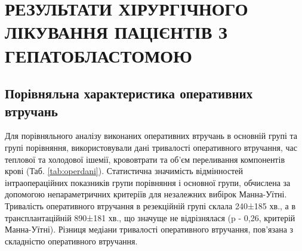 \chapter{РЕЗУЛЬТАТИ ХІРУРГІЧНОГО ЛІКУВАННЯ ПАЦІЄНТІВ З ГЕПАТОБЛАСТОМОЮ}

\section{Порівняльна характеристика оперативних втручань}
Для порівняльного аналізу виконаних оперативних втручань в основній групі та групі порівняння, використовували дані тривалості оперативного втручання, час теплової та холодової ішемії, крововтрати та об'єм переливання компонентів крові (Таб. \ref{tab:operdani}). Статистична значимість відмінностей інтраопераційних показників групи порівняння і основної групи, обчислена за допомогою непараметричних критеріїв для незалежних вибірок Манна-Уїтні.
Тривалість оперативного втручання в резекційній групі склала 240±185 хв., а в трансплантаційній 890±181 хв., що значуще не відрізнялася (p - 0,26, критерій Манна-Уїтні). Різниця медіани тривалості оперативного втручання, пов'язана з складністю оперативного втручання.

